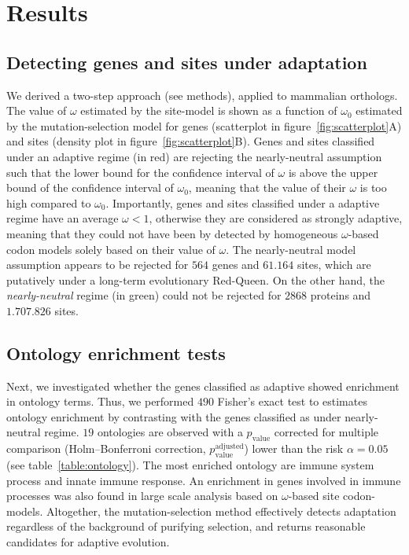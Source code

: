 \documentclass{article}
\begin{document}
\section*{Results}

\subsection*{Detecting genes and sites under adaptation}

We derived a two-step approach (see methods), applied to mammalian orthologs.
The value of $\omega$ estimated by the site-model is shown as a function of $\omega_{0}$ estimated by the mutation-selection model for genes (scatterplot in figure~\ref{fig:scatterplot}A) and sites (density plot in figure~\ref{fig:scatterplot}B).
Genes and sites classified under an adaptive regime (in red) are rejecting the nearly-neutral assumption such that the lower bound for the confidence interval of $\omega$ is above the upper bound of the confidence interval of $\omega_{0}$, meaning that the value of their $\omega$ is too high compared to $\omega_{0}$.
Importantly, genes and sites classified under a adaptive regime have an average $\omega < 1$, otherwise they are considered as strongly adaptive, meaning that they could not have been by detected by homogeneous $\omega$-based codon models solely based on their value of $\omega$.
The nearly-neutral model assumption appears to be rejected for $564$ genes and $61.164$ sites, which are putatively under a long-term evolutionary Red-Queen.
On the other hand, the \textit{nearly-neutral} regime (in green) could not be rejected for $2868$ proteins and $1.707.826$ sites.

\subsection*{Ontology enrichment tests}
Next, we investigated whether the genes classified as adaptive showed enrichment in ontology terms.
Thus, we performed $490$ Fisher's exact test to estimates ontology enrichment by contrasting with the genes classified as under nearly-neutral regime.
$19$ ontologies are observed with a $p_{\mathrm{value}}$ corrected for multiple comparison (Holm–Bonferroni correction, $p_{\mathrm{value}}^{\mathrm{adjusted}}$) lower than the risk $\alpha=0.05$ (see table~\ref{table:ontology}).
The most enriched ontology are immune system process and innate immune response.
An enrichment in genes involved in immune processes was also found in large scale analysis based on $\omega$-based site codon-models\cite{kosiol_patterns_2008}.
Altogether, the mutation-selection method effectively detects adaptation regardless of the background of purifying selection, and returns reasonable candidates for adaptive evolution.
\end{document}
